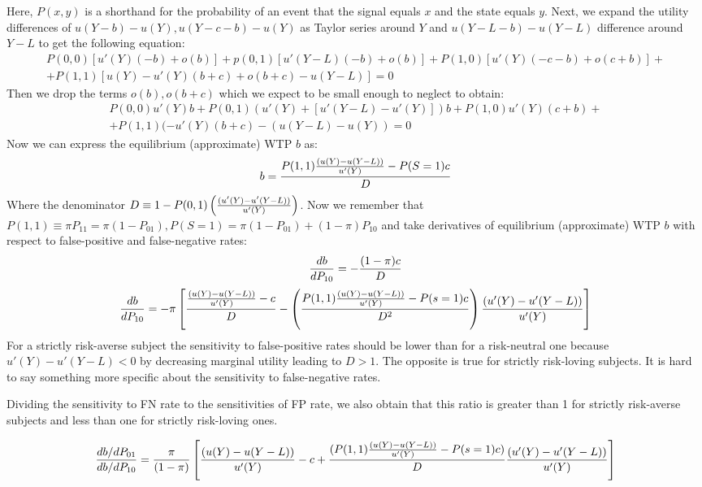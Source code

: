 \documentclass[12pt,a4paper]{article}
\begin{document}
Here, $P(x,y)$ is a shorthand for the probability of an event that the signal equals $x$ and the state equals $y$. Next, we expand the utility differences of $u(Y-b)-u(Y), u(Y-c-b)-u(Y)$ as Taylor series around $Y$ and $u(Y-L-b)-u(Y-L)$ difference around $Y-L$ to get the following equation:\begin{equation}
\begin{split}
P(0,0) [u'(Y)(-b)+o(b)]+p(0,1)[u'(Y-L)(-b)+o(b)]+P(1,0)[u'(Y)(-c-b)+o(c+b)]+\\+P(1,1)[u(Y)-u'(Y)(b+c)+o(b+c)-u(Y-L)]=0
\end{split}
\end{equation}
Then we drop the terms $o(b), o(b+c)$ which we expect to be small enough to neglect to obtain:
\begin{equation}
\begin{split}
P(0,0)u'(Y)b+P(0,1)(u'(Y)+[u'(Y-L)-u'(Y)])b+P(1,0)u'(Y)(c+b)+\\+P(1,1)(-u'(Y)(b+c)-(u(Y-L)-u(Y))=0
\end{split}
\end{equation}
Now we can express the equilibrium (approximate) WTP $b$ as:
\[b={ P(1,1){(u(Y)-u(Y-L)) \over u'(Y)}-P(S=1)c \over D} \]
Where the denominator $D\equiv 1-P(0,1)\left({(u'(Y)-u'(Y-L))\over u'(Y)}\right)$. Now we remember that $P(1,1) \equiv \pi P_{11}=\pi (1-P_{01}), P(S=1)=\pi (1-P_{01})+(1-\pi)P_{10}$ and take derivatives of equilibrium (approximate) WTP $b$ with respect to false-positive and false-negative rates:
\[{db \over dP_{10}}=-{(1-\pi)c \over D} \]
\[{db \over dP_{10}}=-\pi \left[ {{(u(Y)-u(Y-L)) \over u'(Y)}-c \over D}-\left({P(1,1){(u(Y)-u(Y-L)) \over u'(Y)}-P(s=1)c \over D^2}\right) {(u'(Y)-u'(Y-L))\over u'(Y)} \right] \]
For a strictly risk-averse subject the sensitivity to false-positive rates should be lower than for a risk-neutral one because $u'(Y)-u'(Y-L)<0$ by decreasing marginal utility leading to $D>1$. The opposite is true for strictly risk-loving subjects. It is hard to say something more specific about the sensitivity to false-negative rates. 

Dividing the sensitivity to FN rate to the sensitivities of FP rate, we also obtain that this ratio is greater than 1 for strictly risk-averse subjects and less than one for strictly risk-loving ones. 

\[{db/dP_{01} \over db/dP_{10}}={\pi \over (1-\pi)} \left[{(u(Y)-u(Y-L)) \over u'(Y)}-c +{(P(1,1){(u(Y)-u(Y-L)) \over u'(Y)}-P(s=1)c) \over D}{(u'(Y)-u'(Y-L))\over u'(Y)}  \right] \]
\end{document}
